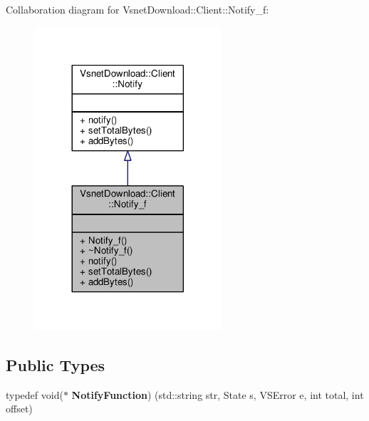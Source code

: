Collaboration diagram for Vsnet\+Download\+:\+:Client\+:\+:Notify\+\_\+f\+:
\nopagebreak
\begin{figure}[H]
\begin{center}
\leavevmode
\includegraphics[width=197pt]{da/dbf/classVsnetDownload_1_1Client_1_1Notify__f__coll__graph}
\end{center}
\end{figure}
\subsection*{Public Types}
\begin{DoxyCompactItemize}
\item 
typedef void($\ast$ {\bfseries Notify\+Function}) (std\+::string str, State s, V\+S\+Error e, int total, int offset)\hypertarget{classVsnetDownload_1_1Client_1_1Notify__f_a90f566413c4e2e5d3dbb2b1de8a63e2d}{}\label{classVsnetDownload_1_1Client_1_1Notify__f_a90f566413c4e2e5d3dbb2b1de8a63e2d}

\end{DoxyCompactItemize}
